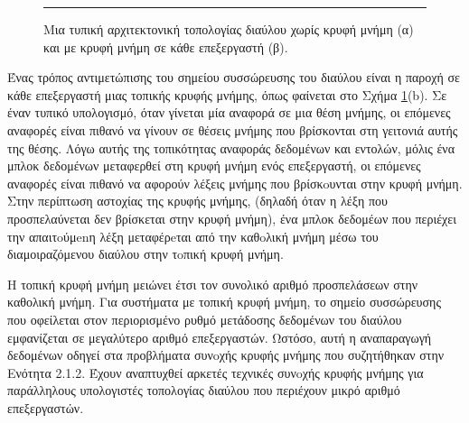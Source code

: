 \documentclass[12pt,a4paper]{article} %
\begin{document}
\begin{figure}[H]
\noindent\rule{\textwidth}{0.2pt}
\caption{Μια τυπική αρχιτεκτονική τοπολογίας διαύλου
χωρίς κρυφή μνήμη (α) και με κρυφή μνήμη
σε κάθε επεξεργαστή (β).}
\label{fig:graph34}
\end{figure}
\vspace{0.3cm}

Ένας τρόπος αντιμετώπισης του σημείου συσσώρευσης του διαύλου είναι η
παροχή σε κάθε επεξεργαστή μιας τοπικής κρυφής μνήμης, όπως 
φαίνεται στο Σχήμα \ref{fig:graph34}(b). Σε έναν τυπικό υπολογισμό, όταν 
γίνεται μία αναφορά σε μια θέση μνήμης, οι επόμενες αναφορές είναι πιθανό 
να γίνουν σε θέσεις μνήμης που βρίσκονται στη γειτονιά αυτής της θέσης. 
Λόγω αυτής της τοπικότητας αναφοράς δεδομένων και εντολών, μόλις ένα 
μπλοκ δεδομένων μεταφερθεί στη κρυφή μνήμη ενός επεξεργαστή, 
οι επόμενες αναφορές είναι πιθανό να αφορούν λέξεις μνήμης που βρίσκoυνται 
στην κρυφή μνήμη. Στην περίπτωση αστοχίας της κρυφής μνήμης, (δηλαδή όταν η λέξη 
που προσπελαύνεται δεν βρίσκεται στην κρυφή μνήμη), ένα μπλοκ δεδομέων που περιέχει 
την απαιτoύμenη λέξη μεταφέρeται από την καθoλική μνήμη μέσω του 
διαμοιραζόμενου διαύλου στην τoπική κρυφή μνήμη.

Η τοπική κρυφή μνήμη μειώνει έτσι τον συνολικό αριθμό προσπελάσεων στην 
καθολική μνήμη. Για συστήματα με τοπική κρυφή μνήμη, το σημείο συσσώρευσης 
που οφείλεται στον περιορισμένο ρυθμό μετάδοσης δεδομένων του διαύλου 
εμφανίζεται σε μεγαλύτερο αριθμό επεξεργαστών. Ωστόσο, αυτή η αναπαραγωγή 
δεδομένων οδηγεί στα προβλήματα συνoχής κρυφής μνήμης που συζητήθηκαν στην Ενότητα 2.1.2. 
Έχουν αναπτυχθεί αρκετές τεχνικές συνoχής κρυφής μνήμης για παράλληλους υπολογιστές 
τοπολογίας διαύλου που περιέχουν μικρό αριθμό επεξεργαστών.
\end{document}
